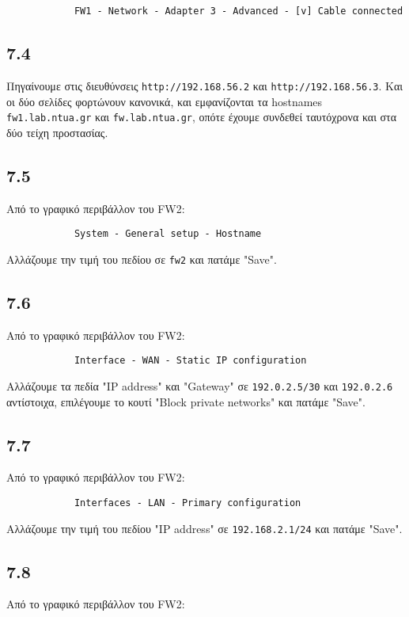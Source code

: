\documentclass[a4paper, 12pt]{article}
\begin{document}
		\begin{verbatim}
			FW1 - Network - Adapter 3 - Advanced - [v] Cable connected
		\end{verbatim}

	\subsection*{7.4}
		Πηγαίνουμε στις διευθύνσεις \verb|http://192.168.56.2| και \verb|http://192.168.56.3|. Και οι δύο σελίδες φορτώνουν κανονικά, και εμφανίζονται τα hostnames \verb|fw1.lab.ntua.gr| και \verb|fw.lab.ntua.gr|, οπότε έχουμε συνδεθεί ταυτόχρονα και στα δύο τείχη προστασίας.

	\subsection*{7.5}
		Από το γραφικό περιβάλλον του FW2:
		
		\begin{verbatim}
			System - General setup - Hostname 
		\end{verbatim}
		
		Αλλάζουμε την τιμή του πεδίου σε \verb|fw2| και πατάμε "Save".

	\subsection*{7.6}
		Από το γραφικό περιβάλλον του FW2:
		
		\begin{verbatim}
			Interface - WAN - Static IP configuration
		\end{verbatim}
		
		Αλλάζουμε τα πεδία "IP address" και "Gateway" σε \verb|192.0.2.5/30| και \verb|192.0.2.6| αντίστοιχα, επιλέγουμε το κουτί "Block private networks" και πατάμε "Save".

	\subsection*{7.7}
		Από το γραφικό περιβάλλον του FW2:
		
		\begin{verbatim}
			Interfaces - LAN - Primary configuration
		\end{verbatim}
		
		Αλλάζουμε την τιμή του πεδίου "IP address" σε \verb|192.168.2.1/24| και πατάμε "Save".

	\subsection*{7.8}
		Από το γραφικό περιβάλλον του FW2:
		
\end{document}
